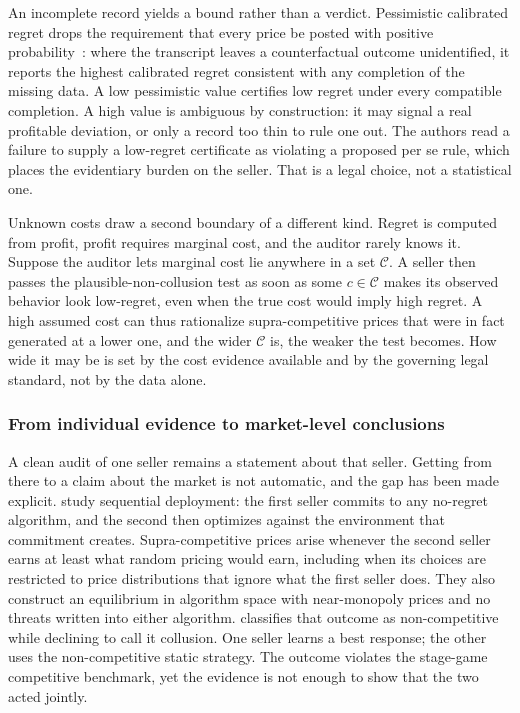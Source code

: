 An incomplete record yields a bound rather than a verdict. Pessimistic calibrated
regret drops the requirement that every price be posted with positive
probability~\citep{HartlineWangZhang2025}: where the transcript leaves a
counterfactual outcome unidentified, it reports the highest calibrated regret
consistent with any completion of the missing data. A low pessimistic value certifies
low regret under every compatible completion. A high value is ambiguous by construction: it may signal a real profitable
deviation, or only a record too thin to rule one out. The authors read a failure to supply a
low-regret certificate as violating a proposed per se rule, which places the
evidentiary burden on the seller. That is a legal choice, not a statistical one.

Unknown costs draw a second boundary of a different kind. Regret is computed from
profit, profit requires marginal cost, and the auditor rarely knows it. Suppose the auditor
lets marginal cost lie anywhere in a set $\mathcal{C}$. A seller then passes the
plausible-non-collusion test as soon as some $c\in\mathcal{C}$ makes its observed
behavior look low-regret, even when the true cost would imply high regret. A high
assumed cost can thus rationalize supra-competitive prices that were in fact generated
at a lower one, and the wider $\mathcal{C}$ is, the weaker the test becomes. How wide
it may be is set by the cost evidence available and by the governing legal standard,
not by the data alone.

\subsubsection{From individual evidence to market-level conclusions}
A clean audit of one seller remains a statement about that seller. Getting from there
to a claim about the market is not automatic, and the gap has been made explicit.
\citet{Arunachaleswaran2025} study sequential deployment: the first seller commits to
any no-regret algorithm, and the second then optimizes against the environment that
commitment creates. Supra-competitive prices arise whenever the second seller earns at least what random pricing would earn, including when its choices are
restricted to price distributions that ignore what the first seller does. They also construct an
equilibrium in algorithm space with near-monopoly prices and no threats written into
either algorithm. \citet{HartlineClarification2026} classifies that outcome as
non-competitive while declining to call it collusion. One seller learns a best
response; the other uses the non-competitive static strategy. The outcome violates the
stage-game competitive benchmark, yet the evidence is not enough to show that the two
acted jointly.


